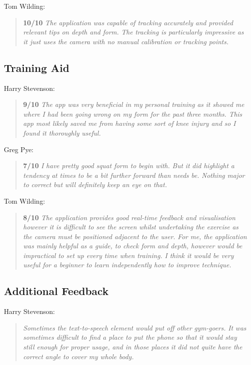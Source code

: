 Tom Wilding:
\begin{quote}
\textbf{10/10} \emph{The application was capable of tracking accurately and provided relevant tips on depth and form. The tracking is particularly impressive as it just uses the camera with no manual calibration or tracking points.}
\end{quote}

\pagebreak
\subsection{Training Aid}

Harry Stevenson:
\begin{quote}
\textbf{9/10} \emph{The app was very beneficial in my personal training as it showed me where I had been going wrong on my form for the past three months. This app most likely saved me from having some sort of knee injury and so I found it thoroughly useful.}
\end{quote}

Greg Pye:
\begin{quote}
\textbf{7/10} \emph{I have pretty good squat form to begin with. But it did highlight a tendency at times to be a bit further forward than needs be. Nothing major to correct but will definitely keep an eye on that.}
\end{quote}

Tom Wilding:
\begin{quote}
\textbf{8/10} \emph{The application provides good real-time feedback and visualisation however it is difficult to see the screen whilst undertaking the exercise as the camera must be positioned adjacent to the user. For me, the application was mainly helpful as a guide, to check form and depth, however would be impractical to set up every time when training. I think it would be very useful for a beginner to learn independently how to improve technique.}
\end{quote}

\subsection{Additional Feedback}

Harry Stevenson:
\begin{quote}
\emph{Sometimes the text-to-speech element would put off other gym-goers. It was sometimes difficult to find a place to put the phone so that it would stay still enough for proper usage, and in those places it did not quite have the correct angle to cover my whole body.}
\end{quote}

